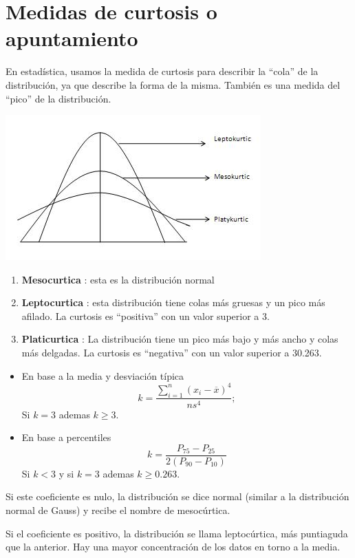 \documentclass[10pt,]{krantz}
\providecommand{\tightlist}{%
  \setlength{\itemsep}{0pt}\setlength{\parskip}{0pt}}
\theoremstyle{definition}
\theoremstyle{definition}
\theoremstyle{definition}
\theoremstyle{definition}
\theoremstyle{remark}
\begin{document}
\hypertarget{medidas-de-curtosis-o-apuntamiento}{%
\chapter{Medidas de curtosis o apuntamiento}\label{medidas-de-curtosis-o-apuntamiento}}

En estadística, usamos la medida de curtosis para describir la ``cola'' de la distribución, ya que describe la forma de la misma. También es una medida del ``pico'' de la distribución.

\includegraphics{curtosis.jpg}

\begin{enumerate}
\def\labelenumi{\arabic{enumi}.}
\tightlist
\item
  \textbf{Mesocurtica} : esta es la distribución normal
\item
  \textbf{Leptocurtica} : esta distribución tiene colas más gruesas y un pico más afilado. La curtosis es ``positiva'' con un valor superior a 3.
\item
  \textbf{Platicurtica} : La distribución tiene un pico más bajo y más ancho y colas más delgadas. La curtosis es ``negativa'' con un valor superior a 30.263.
\end{enumerate}

\begin{itemize}
\item
  En base a la media y desviación típica
  \[k= \frac{\sum_{i=1}^{n}\left( x_i-\overline{x}\right)^4 }{ns^4}; \] Si \(k=3\) ademas \(k\geq 3\).
\item
  En base a percentiles
  \[k= \frac{P_{75}-P_{25}}{2\left( P_{90}-P_{10} \right) }\] Si \(k<3\) y si \(k=3\) ademas \(k\geq 0.263\).
\end{itemize}

Si este coeficiente es nulo, la distribución se dice normal (similar a la distribución normal de Gauss) y recibe el nombre de mesocúrtica.

Si el coeficiente es positivo, la distribución se llama leptocúrtica, más puntiaguda que la anterior. Hay una mayor concentración de los datos en torno a la media.
\end{document}
